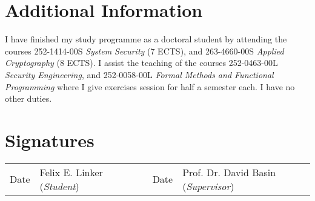 \documentclass{article}
\begin{document}
\section{Additional Information}

I have finished my study programme as a doctoral student by attending the courses 252-1414-00S \textit{System Security} (7 ECTS), and 263-4660-00S \textit{Applied Cryptography} (8 ECTS).
I assist the teaching of the courses 252-0463-00L \textit{Security Engineering}, and 252-0058-00L \textit{Formal Methods and Functional Programming} where I give exercises session for half a semester each.
I have no other duties.

\printbibliography

\newpage
\section*{Signatures}

\vspace{2cm}
\begin{center}
  \def\arraystretch{1.5}
  \begin{tabular}{r p{} p{} r p{}}
    \cline{1-2} \cline{4-5}
    Date & Felix E. Linker (\textit{Student}) & ~ & Date & Prof. Dr. David Basin (\textit{Supervisor})
  \end{tabular}
\end{center}
\end{document}
